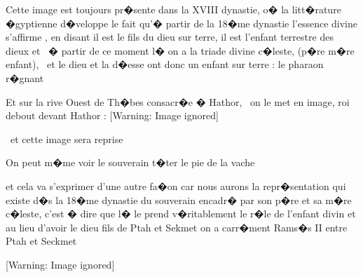 \documentclass{article}
\begin{document}
Cette image est toujours pr�sente dans la XVIII dynastie, o� la litt�rature �gyptienne d�veloppe le fait qu'� partir de la 18�me dynastie l'essence divine s'affirme , en disant {\textquotedbl} il est le fils du dieu sur terre, il est l'enfant terrestre des dieux et \ � partir de ce moment l� on a la triade divine c�leste, (p�re m�re enfant), \ et le dieu et la d�esse ont donc un enfant sur terre : le pharaon r�gnant


\bigskip

Et sur la rive Ouest de Th�bes consacr�e � Hathor, \ on le met en image, roi debout devant Hathor :  [Warning: Image ignored] %
 


\bigskip

\ et cette image sera reprise


\bigskip

On peut m�me voir le souverain t�ter le pie de la vache


\bigskip


\bigskip


\bigskip


\bigskip


\bigskip


\bigskip


\bigskip


\bigskip


\bigskip


\bigskip


\bigskip


\bigskip

et cela va s'exprimer d'une autre fa�on car nous aurons la repr�sentation qui existe d�s la 18�me dynastie du souverain encadr� par son p�re et sa m�re c�leste, c'est � dire que l� le prend v�ritablement le r�le de l'enfant divin et au lieu d'avoir le dieu fils de Ptah et Sekmet on a carr�ment Rams�s II entre Ptah et Seckmet


\bigskip


\bigskip


\bigskip

  [Warning: Image ignored] %
 


\bigskip


\bigskip
\end{document}
